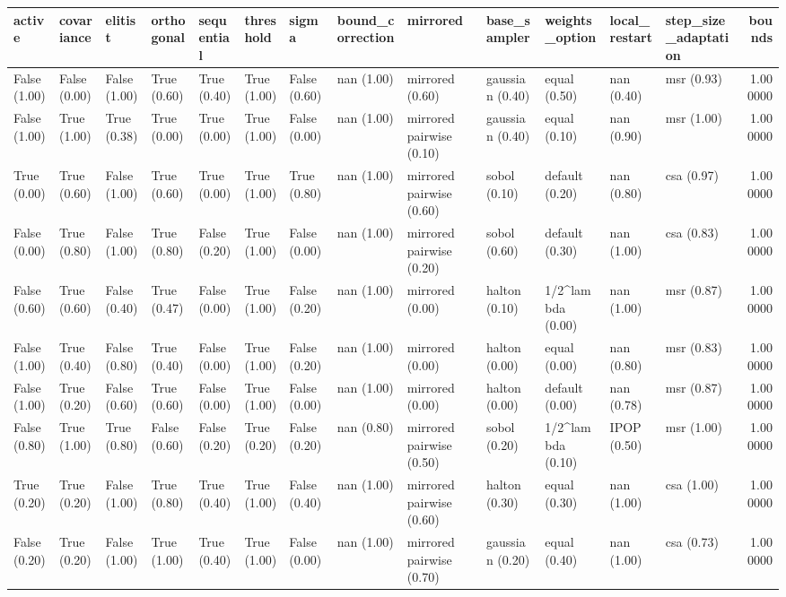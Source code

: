 \begin{tabular}{lllllllllllllr}
\toprule
active & covariance & elitist & orthogonal & sequential & threshold & sigma & bound_correction & mirrored & base_sampler & weights_option & local_restart & step_size_adaptation & bounds \\
\midrule
False (1.00) & False (0.00) & False (1.00) & True (0.60) & True (0.40) & True (1.00) & False (0.60) & nan (1.00) & mirrored (0.60) & gaussian (0.40) & equal (0.50) & nan (0.40) & msr (0.93) & 1.000000 \\
False (1.00) & True (1.00) & True (0.38) & True (0.00) & True (0.00) & True (1.00) & False (0.00) & nan (1.00) & mirrored pairwise (0.10) & gaussian (0.40) & equal (0.10) & nan (0.90) & msr (1.00) & 1.000000 \\
True (0.00) & True (0.60) & False (1.00) & True (0.60) & True (0.00) & True (1.00) & True (0.80) & nan (1.00) & mirrored pairwise (0.60) & sobol (0.10) & default (0.20) & nan (0.80) & csa (0.97) & 1.000000 \\
False (0.00) & True (0.80) & False (1.00) & True (0.80) & False (0.20) & True (1.00) & False (0.00) & nan (1.00) & mirrored pairwise (0.20) & sobol (0.60) & default (0.30) & nan (1.00) & csa (0.83) & 1.000000 \\
False (0.60) & True (0.60) & False (0.40) & True (0.47) & False (0.00) & True (1.00) & False (0.20) & nan (1.00) & mirrored (0.00) & halton (0.10) & 1/2^lambda (0.00) & nan (1.00) & msr (0.87) & 1.000000 \\
False (1.00) & True (0.40) & False (0.80) & True (0.40) & False (0.00) & True (1.00) & False (0.20) & nan (1.00) & mirrored (0.00) & halton (0.00) & equal (0.00) & nan (0.80) & msr (0.83) & 1.000000 \\
False (1.00) & True (0.20) & False (0.60) & True (0.60) & False (0.00) & True (1.00) & False (0.00) & nan (1.00) & mirrored (0.00) & halton (0.00) & default (0.00) & nan (0.78) & msr (0.87) & 1.000000 \\
False (0.80) & True (1.00) & True (0.80) & False (0.60) & False (0.20) & True (0.20) & False (0.20) & nan (0.80) & mirrored pairwise (0.50) & sobol (0.20) & 1/2^lambda (0.10) & IPOP (0.50) & msr (1.00) & 1.000000 \\
True (0.20) & True (0.20) & False (1.00) & True (0.80) & True (0.40) & True (1.00) & False (0.40) & nan (1.00) & mirrored pairwise (0.60) & halton (0.30) & equal (0.30) & nan (1.00) & csa (1.00) & 1.000000 \\
False (0.20) & True (0.20) & False (1.00) & True (1.00) & True (0.40) & True (1.00) & False (0.00) & nan (1.00) & mirrored pairwise (0.70) & gaussian (0.20) & equal (0.40) & nan (1.00) & csa (0.73) & 1.000000 \\

\end{tabular}

